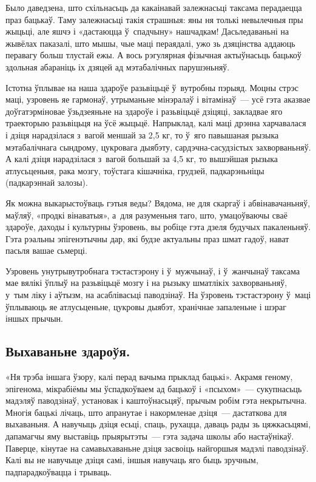 Было даведзена, што схільнасьць да какаінавай залежнасьці таксама перадаецца праз бацькаў. Таму залежнасьці такія страшныя: яны ня толькі невылечныя пры жыцьці, але яшчэ і «дастаюцца ў~спадчыну» нашчадкам! Дасьледаваньні на жывёлах паказалі, што мышы, чые маці пераядалі, ужо зь дзяцінства аддаюць перавагу больш тлустай ежы. А вось рэгулярная фізычная актыўнасьць бацькоў здольная абараніць іх дзяцей ад мэтабалічных парушэньняў.

Істотна ўплывае на наша здароўе разьвіцьцё ў~вутробны пэрыяд. Моцны стрэс маці, узровень яе гармонаў, утрыманьне мінэралаў і вітамінаў~--- усё гэта аказвае доўгатэрміновае ўзьдзеяньне на здароўе і разьвіцьцё дзіцяці, закладвае яго траекторыю разьвіцьця на ўсё жыцьцё. Напрыклад, калі маці дрэнна харчавалася і дзіця нарадзілася з~вагой меншай за 2,5 кг, то ў~яго павышаная рызыка мэтабалічнага сындрому, цукровага дыябэту, сардэчна-сасудзістых захворваньняў. А калі дзіця нарадзілася з~вагой большай за 4,5 кг, то вышэйшая рызыка атлусьценьня, рака мозгу, тоўстага кішачніка, грудзей, падкарэньніцы (падкарэннай залозы).

Як можна выкарыстоўваць гэтыя веды? Вядома, не для скаргаў і абвінавачаньняў, маўляў, «продкі вінаватыя», а~для разуменьня таго, што, умацоўваючы сваё здароўе, даходы і культурны ўзровень, вы робіце гэта дзеля будучых пакаленьняў. Гэта рэальны эпігенэтычны дар, які будзе актуальны праз шмат гадоў, нават пасьля вашае сьмерці.

Узровень унутрывутробнага тэстастэрону і ў~мужчынаў, і ў~жанчынаў таксама мае вялікі ўплыў на разьвіцьцё мозгу і на рызыку шматлікіх захворваньняў, у~тым ліку і аўтызм, на асаблівасьці паводзінаў. На ўзровень тэстастэрону ў~маці ўплываюць яе атлусьценьне, цукровы дыябэт, хранічнае запаленьне і шэраг іншых прычын. 


\subsection*{Выхаваньне здароўя.}

«Ня трэба іншага ўзору, калі перад вачыма прыклад бацькі». Акрамя геному, эпігенома, мікрабіёмы мы ўспадкоўваем ад бацькоў і «псыхом»~--- сукупнасьць мадэляў паводзінаў, установак і каштоўнасьцяў, прычым робім гэта некрытычна. Многія бацькі лічаць, што апранутае і накормленае дзіця~--- дастаткова для выхаваньня. А навучыць дзіця есьці, спаць, рухацца, даваць рады зь цяжкасьцямі, дапамагчы яму выставіць прыярытэты~--- гэта задача школы або настаўнікаў. Паверце, кінутае на самавыхаваньне дзіця засвоіць найгоршыя мадэлі паводзінаў. Калі вы не навучыце дзіця самі, іншыя навучаць яго быць зручным, падпарадкоўвацца і трываць.

